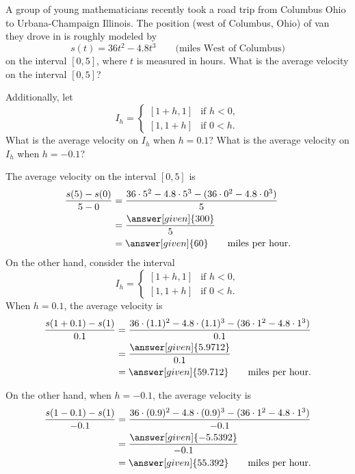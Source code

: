 \documentclass{ximera}
\begin{document}
\begin{example}
A group of young mathematicians recently took a road trip from
Columbus Ohio to Urbana-Champaign Illinois. The position (west of
Columbus, Ohio) of van they drove in is roughly modeled by
\[
s(t) = 36t^2 - 4.8t^3 \qquad\text{(miles West of Columbus)} %
\]
on the interval $[0,5]$, where $t$ is measured in hours. What is the
average velocity on the interval $[0,5]$?

Additionally, let
\[
I_h= \begin{cases}
  [1+h,1]  & \text{if $h<0$}, \\ %
  [1,1+h]  & \text{if $0<h$}.     %
\end{cases}
\]
What is the average velocity on $I_h$ when $h= 0.1$?
What is the average velocity on $I_h$ when $h= -0.1$?
\begin{explanation}
  The average velocity on the interval $[0,5]$ is
  \begin{align*}
  \frac{s(5)-s(0)}{5-0} &= \frac{36\cdot 5^2 - 4.8\cdot 5^3 - (36\cdot 0^2 - 4.8\cdot 0^3)}{5}\\
  &=\frac{\answer[given]{300}}{5}\\
  &=\answer[given]{60}\qquad\text{miles per hour.}
  \end{align*}
  On the other hand, consider the interval
  \[
  I_h = 
  \begin{cases}
    [1+h,1]  & \text{if $h<0$}, \\ %
    [1,1+h]  & \text{if $0<h$}.     %
  \end{cases}
  \]
  When $h = 0.1$, the average velocity is
  \begin{align*}
    \frac{s(1+0.1)-s(1)}{0.1} &= \frac{36\cdot (1.1)^2 - 4.8\cdot (1.1)^3 - (36\cdot 1^2 - 4.8 \cdot 1^3)}{0.1}\\
    &=\frac{\answer[given]{5.9712}}{0.1}\\
    &=\answer[given]{59.712}\qquad\text{miles per hour.}
  \end{align*}
  
  On the other hand, when $h=-0.1$, the average velocity is
  \begin{align*}
    \frac{s(1-0.1)-s(1)}{-0.1} &= \frac{36\cdot (0.9)^2 - 4.8\cdot (0.9)^3 - (36\cdot 1^2 - 4.8 \cdot 1^3)}{-0.1}\\
    &=\frac{\answer[given]{-5.5392}}{-0.1}\\
    &=\answer[given]{55.392}\qquad\text{miles per hour.}
  \end{align*}
\end{explanation}
\end{example}
\end{document}
